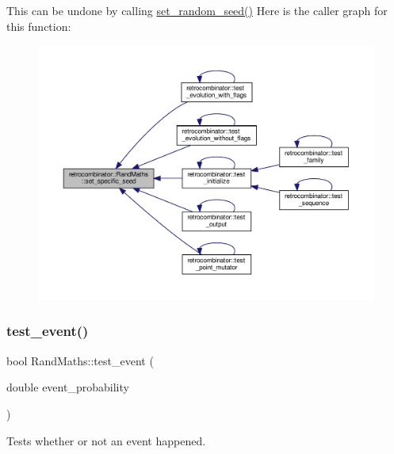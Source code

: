This can be undone by calling {\ttfamily \hyperlink{classretrocombinator_1_1RandMaths_a2b61e31de6067ffa35531d5bde40f4c6}{set\+\_\+random\+\_\+seed()}} Here is the caller graph for this function\+:
\nopagebreak
\begin{figure}[H]
\begin{center}
\leavevmode
\includegraphics[width=350pt]{classretrocombinator_1_1RandMaths_a0bf1c2e7a1eccb1f9246b3fceeb5db8a_icgraph}
\end{center}
\end{figure}
\mbox{\label{classretrocombinator_1_1RandMaths_a183686140a9da18ad40c7e048ee8914e}} 
\subsubsection{\texorpdfstring{test\+\_\+event()}{test\_event()}}
{\footnotesize\ttfamily bool Rand\+Maths\+::test\+\_\+event (\begin{DoxyParamCaption}\item[{double}]{event\+\_\+probability }\end{DoxyParamCaption})}



Tests whether or not an event happened. 

